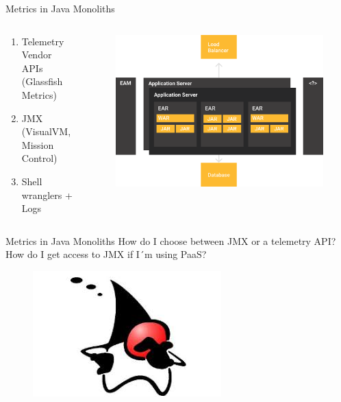 \documentclass{beamer}
\begin{document}
\begin{frame}{Metrics in Java Monoliths}
\begin{columns}[T] %
	\begin{column}[T]{3cm} %
		\begin{enumerate}
			\item Telemetry Vendor APIs (Glassfish Metrics)
			\item JMX  (VisualVM, Mission Control)
			\item Shell wranglers + Logs
		\end{enumerate}
	\end{column}
	\begin{column}[T]{7cm} %
		\begin{figure}
			\centering
			\includegraphics[width=\linewidth]{Images/monolitos}
		\end{figure}
		
	\end{column}
\end{columns}
\end{frame}

\begin{frame}{Metrics in Java Monoliths}
\Large How do I choose between JMX or a telemetry API? How do I get access to JMX if I´m using PaaS?
\begin{figure}
	\centering
	\includegraphics[width=0.6\linewidth]{Images/dukewhy}
\end{figure}
\end{frame}
\end{document}
